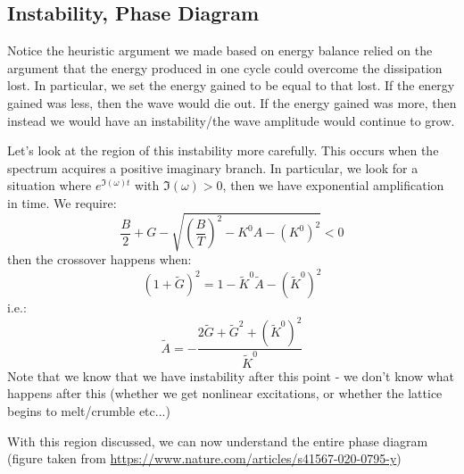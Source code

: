 \subsection{Instability, Phase Diagram}
Notice the heuristic argument we made based on energy balance relied on the argument that the energy produced in one cycle could overcome the dissipation lost. In particular, we set the energy gained to be equal to that lost. If the energy gained was less, then the wave would die out. If the energy gained was more, then instead we would have an instability/the wave amplitude would continue to grow.

Let's look at the region of this instability more carefully. This occurs when the spectrum acquires a positive imaginary branch. In particular, we look for a situation where $e^{\Im(\omega)t}$ with $\Im(\omega) > 0$, then we have exponential amplification in time. We require:
\begin{equation}
    \frac{B}{2} + G - \sqrt{\left(\frac{B}{T}\right)^2 - K^0A - (K^0)^2} < 0
\end{equation}
then the crossover happens when:
\begin{equation}
    \left(1 + \tilde{G}\right)^2 = 1 - \tilde{K}^0\tilde{A} - (\tilde{K}^0)^2
\end{equation}
i.e.:
\begin{equation}
    \tilde{A} = -\frac{2\tilde{G} +\tilde{G}^2 + (\tilde{K}^0)^2}{\tilde{K}^0}
\end{equation}
Note that we know that we have instability after this point - we don't know what happens after this (whether we get nonlinear excitations, or whether the lattice begins to melt/crumble etc...)

With this region discussed, we can now understand the entire phase diagram (figure taken from \url{https://www.nature.com/articles/s41567-020-0795-y})

